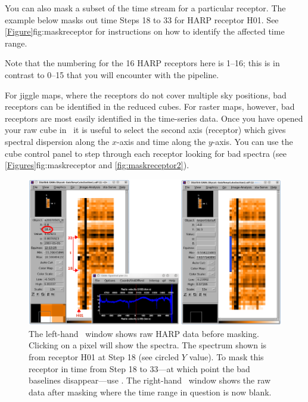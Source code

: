 \documentclass[11pt,oneside,chapters]{starlink}
\begin{document}
\begin{terminalv}
\end{terminalv}
You can also mask a subset of the time stream for a particular
receptor. The example below masks out time Steps 18 to 33 for HARP receptor
H01. See \cref{Figure}{fig:maskreceptor}{} for instructions on how to
identify the affected time range.
\begin{terminalv}
\end{terminalv}
Note that the numbering for the 16 HARP receptors here is 1--16; this is in
contrast to 0--15 that you will encounter with the pipeline.

For jiggle maps, where the receptors do not cover multiple sky
positions, bad receptors can be identified in the reduced cubes. For
raster maps, however, bad receptors are most easily identified in the
time-series data. Once you have opened your raw cube in \gaia\ it is
useful to select the second axis (receptor) which gives spectral
dispersion along the $x$-axis and time along the $y$-axis. You can use
the cube control panel to step through each receptor looking for bad
spectra (see \cref{Figures}{fig:maskreceptor}{} and
\ref{fig:maskreceptor2}).

\begin{figure}[h!]
\begin{center}
\includegraphics[width=1\linewidth]{sc20_maskreceptor}
\caption[Identifying bad receptors in the raw data.]{\label{fig:maskreceptor}
  The left-hand \gaia\ window shows raw HARP data before masking.
  Clicking on a pixel will show the spectra. The spectrum shown is from
  receptor H01 at Step 18 (see circled $Y$ value). To mask this receptor
  in time from Step 18 to 33---at which point the bad baselines
  disappear---use \chpix. The right-hand \gaia\ window shows the raw
  data after masking where the time range in question is now blank.}
\end{center}
\end{figure}
\end{document}
